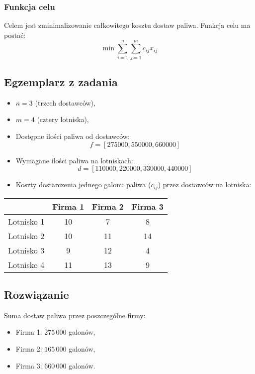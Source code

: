 \documentclass{article}
\begin{document}
\subsubsection{Funkcja celu}
Celem jest zminimalizowanie całkowitego kosztu dostaw paliwa. Funkcja celu ma postać:
\[
\min \sum_{i=1}^{n} \sum_{j=1}^{m} c_{ij} x_{ij}
\]

\subsection{Egzemplarz z zadania}
\begin{itemize}
    \item $n = 3$ (trzech dostawców),
    \item $m = 4$ (cztery lotniska),
    \item Dostępne ilości paliwa od dostawców:
    \[
    f = [275000, 550000, 660000]
    \]
    \item Wymagane ilości paliwa na lotniskach:
    \[
    d = [110000, 220000, 330000, 440000]
    \]
    \item Koszty dostarczenia jednego galonu paliwa ($c_{ij}$) przez dostawców na lotniska:
\end{itemize}

\begin{table}[h!]
    \centering
    \begin{tabular}{|c|c|c|c|}
        \hline
        & Firma 1 & Firma 2 & Firma 3\\
        \hline
        Lotnisko 1 & 10 & 7 & 8\\
        \hline
        Lotnisko 2 & 10 & 11 & 14\\
        \hline
        Lotnisko 3 & 9 & 12 & 4\\
        \hline
        Lotnisko 4 & 11 & 13 & 9\\
        \hline
    \end{tabular}
\end{table}


\subsection{Rozwiązanie}
Suma dostaw paliwa przez poszczególne firmy:
\begin{itemize}
    \item Firma 1: $275\,000$ galonów,
    \item Firma 2: $165\,000$ galonów,
    \item Firma 3: $660\,000$ galonów.
\end{itemize}
\end{document}
